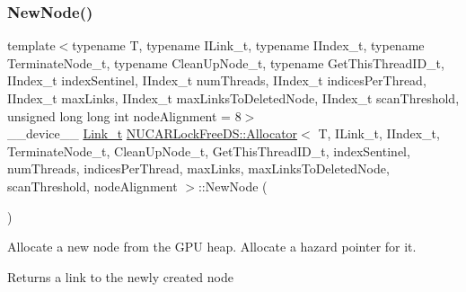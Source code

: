 \subsubsection{\texorpdfstring{New\+Node()}{NewNode()}}
{\footnotesize\ttfamily template$<$typename T, typename I\+Link\+\_\+t, typename I\+Index\+\_\+t, typename Terminate\+Node\+\_\+t, typename Clean\+Up\+Node\+\_\+t, typename Get\+This\+Thread\+I\+D\+\_\+t, I\+Index\+\_\+t index\+Sentinel, I\+Index\+\_\+t num\+Threads, I\+Index\+\_\+t indices\+Per\+Thread, I\+Index\+\_\+t max\+Links, I\+Index\+\_\+t max\+Links\+To\+Deleted\+Node, I\+Index\+\_\+t scan\+Threshold, unsigned long long int node\+Alignment = 8$>$ \\
\+\_\+\+\_\+device\+\_\+\+\_\+ \mbox{\hyperlink{class_n_u_c_a_r_lock_free_d_s_1_1_allocator_a5508d82b795e6c1977bebb67b5e5b686}{Link\+\_\+t}} \mbox{\hyperlink{class_n_u_c_a_r_lock_free_d_s_1_1_allocator}{N\+U\+C\+A\+R\+Lock\+Free\+D\+S\+::\+Allocator}}$<$ T, I\+Link\+\_\+t, I\+Index\+\_\+t, Terminate\+Node\+\_\+t, Clean\+Up\+Node\+\_\+t, Get\+This\+Thread\+I\+D\+\_\+t, index\+Sentinel, num\+Threads, indices\+Per\+Thread, max\+Links, max\+Links\+To\+Deleted\+Node, scan\+Threshold, node\+Alignment $>$\+::New\+Node (\begin{DoxyParamCaption}{ }\end{DoxyParamCaption})\hspace{0.3cm}{\ttfamily [inline]}}

Allocate a new node from the G\+PU heap. Allocate a hazard pointer for it. \begin{DoxyReturn}{Returns}
a link to the newly created node 
\end{DoxyReturn}
\mbox{\label{class_n_u_c_a_r_lock_free_d_s_1_1_allocator_a7c4e8ba73a5018483ca63c09f94daca3}} 
